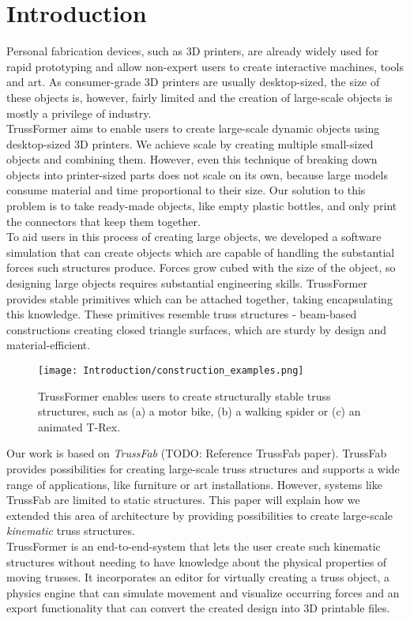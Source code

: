 \chapter{Introduction}\label{ch:introduction}
Personal fabrication devices, such as 3D printers, are already widely used for rapid prototyping and allow non-expert users to create interactive machines, tools and art. As consumer-grade 3D printers are usually desktop-sized, the size of these objects is, however, fairly limited and the creation of large-scale objects is mostly a privilege of industry.\\
TrussFormer aims to enable users to create large-scale dynamic objects using desktop-sized 3D printers. We achieve scale by creating multiple small-sized objects and combining them. However, even this technique of breaking down objects into printer-sized parts does not scale on its own, because large models consume material and time proportional to their size. Our solution to this problem is to take ready-made objects, like empty plastic bottles, and only print the connectors that keep them together.\\
To aid users in this process of creating large objects, we developed a software simulation that can create objects which are capable of handling the substantial forces such structures produce. Forces grow cubed with the size of the object, so designing large objects requires substantial engineering skills. TrussFormer provides stable primitives which can be attached together, taking encapsulating this knowledge. These primitives resemble truss structures - beam-based constructions creating closed triangle surfaces, which are sturdy by design and material-efficient.\\
\begin{figure}[h!]
    \texttt{[image: Introduction/construction\_examples.png]}
    \centering
    \caption{TrussFormer enables users to create structurally stable truss structures, such as (a) a motor bike, (b) a walking spider or (c) an animated T-Rex.}
    \label{fig:examples}
\end{figure}
Our work is based on \textit{TrussFab} (TODO: Reference TrussFab paper). TrussFab provides possibilities for creating large-scale truss structures and supports a wide range of applications, like furniture or art installations. However, systems like TrussFab are limited to static structures. This paper will explain how we extended this area of architecture by providing possibilities to create large-scale \textit{kinematic} truss structures.\\
TrussFormer is an end-to-end-system that lets the user create such kinematic structures without needing to have knowledge about the physical properties of moving trusses. It incorporates an editor for virtually creating a truss object, a physics engine that can simulate movement and visualize occurring forces and an export functionality that can convert the created design into 3D printable files.

